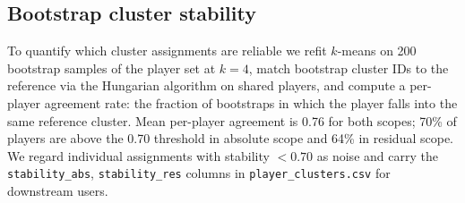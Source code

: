 \documentclass[11pt]{article}
\begin{document}
\subsection{Bootstrap cluster stability}

To quantify which cluster assignments are reliable we refit $k$-means on 200 bootstrap samples of the player set at $k=4$, match bootstrap cluster IDs to the reference via the Hungarian algorithm on shared players, and compute a per-player agreement rate: the fraction of bootstraps in which the player falls into the same reference cluster.  Mean per-player agreement is 0.76 for both scopes; 70\% of players are above the 0.70 threshold in absolute scope and 64\% in residual scope.  We regard individual assignments with stability $< 0.70$ as noise and carry the \texttt{stability\_abs}, \texttt{stability\_res} columns in \texttt{player\_clusters.csv} for downstream users.
\end{document}
